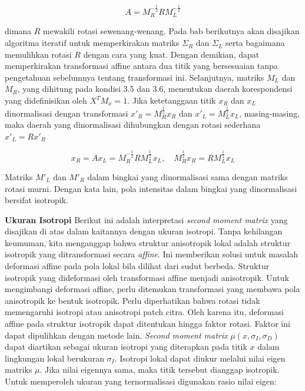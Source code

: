 \begin{equation*}
  A = M_{R}^{-\frac{1}{2}}R M_{L}^{-\frac{1}{2}}
\end{equation*}

dimana \(R\) mewakili rotasi sewenang-wenang. Pada bab berikutnya akan disajikan algoritma iteratif untuk memperkirakan matriks \(\Sigma_{R}\) dan \(\Sigma_{L}\) serta bagaimana memulihkan rotasi \(R\) dengan cara yang kuat. Dengan demikian, dapat memperkirakan transformasi affine antara dua titik yang bersesuaian tanpa pengetahuan sebelumnya tentang transformasi ini. Selanjutnya, matriks \(M_{L}\) dan \(M_{R}\), yang dihitung pada kondisi 3.5 dan 3.6, menentukan daerah korespondensi yang didefinisikan oleh \(X^{T}M_{x}=1\). Jika ketetanggaan titik \(x_{R}\) dan \(x_{L}\) dinormalisasi dengan transformasi \(x'_{R}=M^{\frac{1}{2}}_{R}x_{R}\) dan \(x'_{L}=M^{\frac{1}{2}}_{L}x_{L}\), masing-masing, maka daerah yang dinormalisasi dihubungkan dengan rotasi sederhana \(x'_{L}=Rx'_{R}\)

\begin{equation}
  x_{R} = A x_{L} = M_{R}^{-\frac{1}{2}}R M_{L}^{\frac{1}{2}} x_{L}, \quad M_{R}^{\frac{1}{2}}x_{R} = R M_{L}^{\frac{1}{2}} x_{L}
\end{equation}

Matriks \(M'_{L}\) dan \(M'_{R}\) dalam bingkai yang dinormalisasi sama dengan matriks rotasi murni. Dengan kata lain, pola intensitas dalam bingkai yang dinormalisasi bersifat isotropik.

\textbf{Ukuran Isotropi} Berikut ini adalah interpretasi \emph{second moment matrix} yang disajikan di atas dalam kaitannya dengan ukuran isotropi. Tanpa kehilangan keumuman, kita menganggap bahwa struktur anisotropik lokal adalah struktur isotropik yang ditransformasi secara \emph{affine}. Ini memberikan solusi untuk masalah deformasi affine pada pola lokal bila dilihat dari sudut berbeda. Struktur isotropik yang dideformasi oleh transformasi affine menjadi anisotropik. Untuk mengimbangi deformasi affine, perlu ditemukan transformasi yang membawa pola anisotropik ke bentuk isotropik. Perlu diperhatikan bahwa rotasi tidak memengaruhi isotropi atau anisotropi patch citra. Oleh karena itu, deformasi affine pada struktur isotropik dapat ditentukan hingga faktor rotasi. Faktor ini dapat dipulihkan dengan metode lain. \emph{Second moment matrix} \(\mu(x,\sigma_{I},\sigma_{D})\) dapat diartikan sebagai ukuran isotropi yang diterapkan pada titik \(x\) dalam lingkungan lokal berukuran \(\sigma_{I}\). Isotropi lokal dapat diukur melalui nilai eigen matriks \(\mu\). Jika nilai eigennya sama, maka titik tersebut dianggap isotropik. Untuk memperoleh ukuran yang ternormalisasi digunakan rasio nilai eigen:

